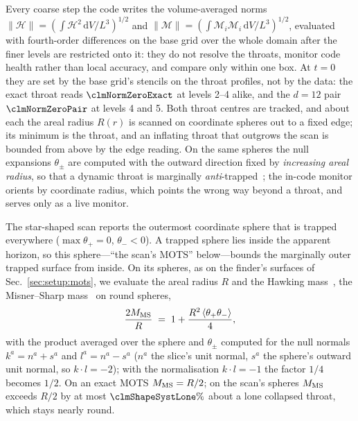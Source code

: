 \documentclass[twocolumn,floatfix,aps,prd,superscriptaddress,nofootinbib]{revtex4-2}
\begin{document}
Every coarse step the code writes the volume-averaged norms $\|\mathcal H\|=(\int\mathcal H^2\,\mathrm{d}V/L^3)^{1/2}$ and $\|\mathcal M\|=(\int\mathcal M_i\mathcal M_i\,\mathrm{d}V/L^3)^{1/2}$, evaluated with fourth-order differences on the base grid over the whole domain after the finer levels are restricted onto it: they do not resolve the throats, monitor code health rather than local accuracy, and compare only within one box. At $t=0$ they are set by the base grid's stencils on the throat profiles, not by the data: the exact throat reads $\clmNormZeroExact$ at levels 2--4 alike, and the $d=12$ pair $\clmNormZeroPair$ at levels 4 and 5. Both throat centres are tracked, and about each the areal radius $R(r)$ is scanned on coordinate spheres out to a fixed edge; its minimum is the throat, and an inflating throat that outgrows the scan is bounded from above by the edge reading. On the same spheres the null expansions $\theta_\pm$ are computed with the outward direction fixed by \emph{increasing areal radius}, so that a dynamic throat is marginally \emph{anti}-trapped~\cite{hochberg_visser1998,hayward1999}; the in-code monitor orients by coordinate radius, which points the wrong way beyond a throat, and serves only as a live monitor.

The star-shaped scan reports the outermost coordinate sphere that is trapped everywhere ($\max\theta_+=0$, $\theta_-<0$). A trapped sphere lies inside the apparent horizon, so this sphere---``the scan's MOTS'' below---bounds the marginally outer trapped surface from inside. On its spheres, as on the finder's surfaces of Sec.~\ref{sec:setup:mots}, we evaluate the areal radius $R$ and the Hawking mass~\cite{hawking1968}, the Misner--Sharp mass~\cite{misner_sharp1964} on round spheres,
\begin{equation}
\frac{2M_{\rm MS}}{R} \;=\; 1 + \frac{R^{2}\,\langle\theta_+\theta_-\rangle}{4},
\label{eq:misner_sharp}
\end{equation}
with the product averaged over the sphere and $\theta_\pm$ computed for the null normals $k^a=n^a+s^a$ and $l^a=n^a-s^a$ ($n^a$ the slice's unit normal, $s^a$ the sphere's outward unit normal, so $k\cdot l=-2$); with the normalisation $k\cdot l=-1$ the factor $1/4$ becomes $1/2$. On an exact MOTS $M_{\rm MS}=R/2$; on the scan's spheres $M_{\rm MS}$ exceeds $R/2$ by at most $\clmShapeSystLone\%$ about a lone collapsed throat, which stays nearly round.
\end{document}

